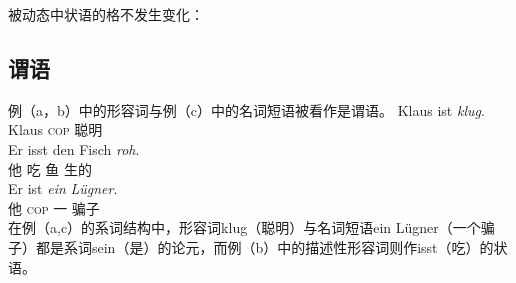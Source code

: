 被动态中状语的格不发生变化：
\eal
{}
\zl
{}

\subsection{谓语}
例（a，b）中的形容词与例（c）中的名词短语被看作是谓语。
\eal
\ex 
\gll Klaus ist \emph{klug}.\\
	 Klaus \textsc{cop} 聪明\\
\ex 
\gll Er isst den Fisch \emph{roh}.\\
	 他 吃  鱼 生的\\
\ex 
\gll Er ist \emph{ein} \emph{Lügner}.\\
     他 \textsc{cop} 一 骗子\\
\zl
在例（a,c）的系词结构中，形容词klug（聪明）与名词短语ein Lügner（一个骗子）都是系词sein（是）的论元，而例（b）中的描述性形容词则作isst（吃）的状语。

